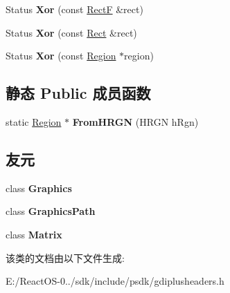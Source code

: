 \begin{DoxyCompactItemize}
\item 
\mbox{\label{class_region_a6fafb26164e1a08c962a1ae250c430ea}} 
Status {\bfseries Xor} (const \hyperlink{struct_rect_f}{RectF} \&rect)
\item 
\mbox{\label{class_region_a966819cb4218c342d449427fd55b3578}} 
Status {\bfseries Xor} (const \hyperlink{struct_rect}{Rect} \&rect)
\item 
\mbox{\label{class_region_a1284c71a358811607c98ec1a94267c48}} 
Status {\bfseries Xor} (const \hyperlink{class_region}{Region} $\ast$region)
\end{DoxyCompactItemize}
\subsection*{静态 Public 成员函数}
\begin{DoxyCompactItemize}
\item 
\mbox{\label{class_region_a39226d5acbd1779e50c53e6f199cf488}} 
static \hyperlink{class_region}{Region} $\ast$ {\bfseries From\+H\+R\+GN} (H\+R\+GN h\+Rgn)
\end{DoxyCompactItemize}
\subsection*{友元}
\begin{DoxyCompactItemize}
\item 
\mbox{\label{class_region_ae5cfe0c0e0b06d536d5814bd1ff4818f}} 
class {\bfseries Graphics}
\item 
\mbox{\label{class_region_ab12c7f574c53c0e0ab06f01bd72faa35}} 
class {\bfseries Graphics\+Path}
\item 
\mbox{\label{class_region_a34913a9261681f734171a6da06bd56fe}} 
class {\bfseries Matrix}
\end{DoxyCompactItemize}


该类的文档由以下文件生成\+:\begin{DoxyCompactItemize}
\item 
E\+:/\+React\+O\+S-\/0../sdk/include/psdk/gdiplusheaders.\+h\end{DoxyCompactItemize}
